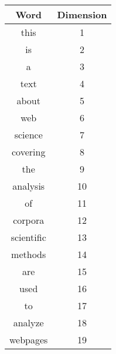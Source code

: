 \documentclass{WeSTassignment}
\begin{document}
\begin{enumerate}
\begin{tabular}{|c|c|}
\hline
Word & Dimension \\
\hline
this & 1\\
is & 2\\ 
a & 3\\
text & 4\\
about & 5\\
web & 6\\
science & 7\\
covering & 8\\
the & 9\\
analysis & 10\\
of & 11\\
corpora & 12\\
scientific & 13\\
methods & 14\\
are & 15\\
used & 16\\
to & 17\\
analyze & 18\\
webpages & 19 \\
\hline
\end{tabular}

\end{enumerate}
\end{document}
